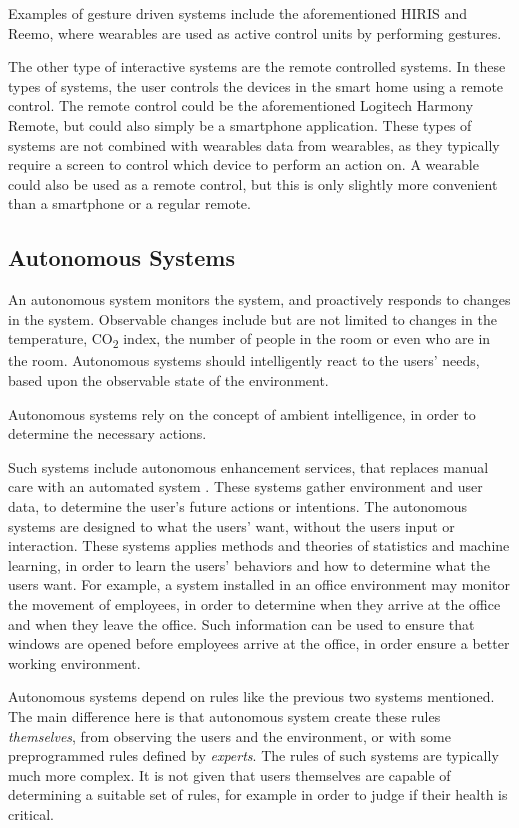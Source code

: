 Examples of gesture driven systems include the aforementioned HIRIS and Reemo, 
where wearables are used as active control units by performing gestures. 

The other type of interactive systems are the remote controlled systems. 
In these types of systems, the user controls the devices in the smart home using a remote control. 
The remote control could be the aforementioned Logitech Harmony Remote, 
but could also simply be a smartphone application. 
These types of systems are not combined with wearables data from wearables, 
as they typically require a screen to control which device to perform an action on.
A wearable could also be used as a remote control, 
but this is only slightly more convenient than a smartphone or a regular remote.

\subsection{Autonomous Systems}

An autonomous system monitors the system, 
and proactively responds to changes in the system. 
Observable changes include but are not limited to changes in the temperature, 
CO\textsubscript{2} index, the number of people in the room or even who are in the room.
Autonomous systems should intelligently react to the users' needs, 
based upon the observable state of the environment.

Autonomous systems rely on the concept of ambient intelligence, 
in order to determine the necessary actions.

Such systems include autonomous enhancement services, 
that replaces manual care with an automated system \cite{nehmer2006living}. 
These systems gather environment and user data, 
to determine the user's future actions or intentions. 
The autonomous systems are designed to what the users' want, 
without the users input or interaction. 
These systems applies methods and theories of statistics and machine learning, 
in order to learn the users' behaviors and how to determine what the users want. 
For example, a system installed in an office environment may monitor the movement of employees, 
in order to determine when they arrive at the office and when they leave the office. 
Such information can be used to ensure that windows are opened before employees arrive at the office, 
in order ensure a better working environment.

Autonomous systems depend on rules like the previous two systems mentioned. 
The main difference here is that autonomous system create these rules \emph{themselves}, 
from observing the users and the environment, 
or with some preprogrammed rules defined by \emph{experts}.
The rules of such systems are typically much more complex. 
It is not given that users themselves are capable of determining a suitable set of rules, 
for example in order to judge if their health is critical. 

